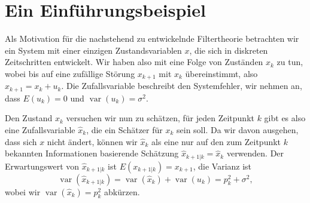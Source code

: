 %
%
%

\section{Ein Einführungsbeispiel}
Als Motivation für die nachstehend zu entwickelnde Filtertheorie betrachten
wir ein System mit einer einzigen Zustandsvariablen $x$, die sich in diskreten
Zeitschritten entwickelt.
Wir haben also mit eine Folge von Zuständen $x_k$ zu tun, wobei
bis auf eine zufällige Störung $x_{k+1}$ mit $x_k$ übereinstimmt,
also $x_{k+1}=x_k+u_k$.
Die Zufallsvariable beschreibt den Systemfehler, wir
nehmen an, dass $E(u_k)=0$ und $\operatorname{var}(u_k)=\sigma^2$.

Den Zustand $x_k$ versuchen wir nun zu schätzen, für jeden Zeitpunkt
$k$ gibt es also eine Zufallsvariable $\hat x_k$, die ein Schätzer für
$x_k$ sein soll.
Da wir davon ausgehen, dass sich $x$ nicht ändert, können wir $\hat x_k$
als eine nur auf den zum Zeitpunkt $k$ bekannten Informationen basierende
Schätzung $\hat x_{k+1|k}=\hat x_k$ verwenden.
Der Erwartungswert von $\hat x_{k+1|k}$ ist $E(x_{k+1|k})=x_{k+1}$, die Varianz
ist
\[
\operatorname{var}(\hat x_{k+1|k})
=\operatorname{var}(\hat x_k)+\operatorname{var}(u_k)=p_k^2+\sigma^2,
\]
wobei wir $\operatorname{var}(\hat x_k)=p_k^2$ abkürzen.

